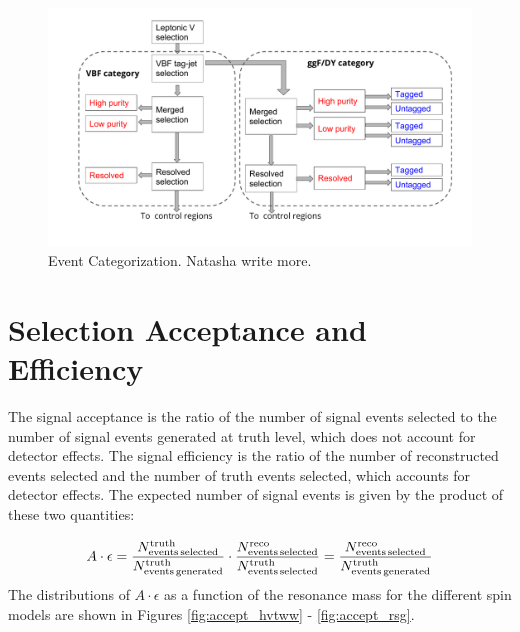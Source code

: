 \begin{figure}[h!]
  \centering
  \includegraphics[width=\hsize]{figures/Analysis/cutflow.pdf}  
  \caption{Event Categorization. Natasha write more.} 

  \label{fig:cutflow}
\end{figure} 
\FloatBarrier

\section{Selection Acceptance and Efficiency}
The signal acceptance is the ratio of the number of signal events selected to the number of signal events generated at truth level, which does not account for detector effects. The signal efficiency is the ratio of the number of reconstructed events selected and the number of truth events selected, which accounts for detector effects. The expected number of signal events is given by the product of these two quantities:

\begin{equation}
A \cdot \epsilon = \frac{N^{\mathrm{truth}}_{\mathrm{events\, selected}}}{N^{\mathrm{truth}}_{\mathrm{events\, generated}}} \cdot \frac{N^{\mathrm{reco}}_{\mathrm{events\, selected}}}{N^{\mathrm{truth}}_{\mathrm{events\, selected}}}
\\
= \frac{N^{\mathrm{reco}}_{\mathrm{events\, selected}}}{N^{\mathrm{truth}}_{\mathrm{events\, generated}}}
\end{equation}
The distributions of $A\cdot \epsilon$ as a function of the resonance mass for the different spin models are shown in Figures \ref{fig:accept_hvtww} - \ref{fig:accept_rsg}.

